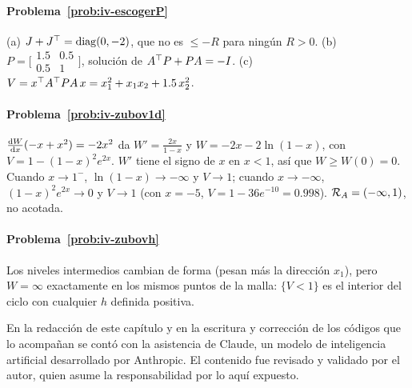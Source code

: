 \paragraph{Problema~\ref{prob:iv-escogerP}}
(a) $J+J^{\top}=\operatorname{diag}(0,-2)$, que no es $\le-R$ para ningún $R>0$. (b) $P=\bigl[\begin{smallmatrix}1.5&0.5\\0.5&1\end{smallmatrix}\bigr]$, solución de $A^{\top} P+PA=-I$. (c) $V=x^{\top} A^{\top} PA\,x=x_1^2+x_1x_2+1.5\,x_2^2$.

\paragraph{Problema~\ref{prob:iv-zubov1d}}
$\frac{\mathrm{d} W}{\mathrm{d} x}(-x+x^2)=-2x^2$ da $W'=\frac{2x}{1-x}$ y $W=-2x-2\ln(1-x)$, con $V=1-(1-x)^2e^{2x}$. $W'$ tiene el signo de $x$ en $x<1$, así que $W\ge W(0)=0$. Cuando $x\to1^-$, $\ln(1-x)\to-\infty$ y $V\to1$; cuando $x\to-\infty$, $(1-x)^2e^{2x}\to0$ y $V\to1$ (con $x=-5$, $V=1-36e^{-10}=0.998$). $\mathcal{R}_A=(-\infty,1)$, no acotada.

\paragraph{Problema~\ref{prob:iv-zubovh}}
Los niveles intermedios cambian de forma (pesan más la dirección $x_1$), pero $W=\infty$ exactamente en los mismos puntos de la malla: $\{V<1\}$ es el interior del ciclo con cualquier $h$ definida positiva.

\respuestaspausas

\begin{parallevar}
En la redacción de este capítulo y en la escritura y corrección de los códigos que lo acompañan se contó con la asistencia de Claude, un modelo de inteligencia artificial desarrollado por Anthropic. El contenido fue revisado y validado por el autor, quien asume la responsabilidad por lo aquí expuesto.
\end{parallevar}
